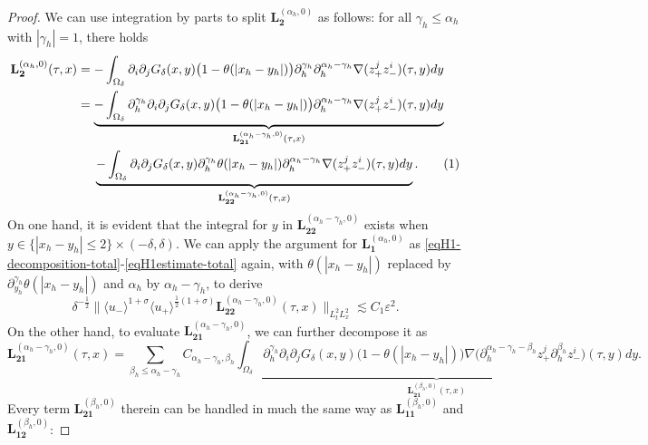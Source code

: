 \documentclass[10pt,reqno]{amsart}
\numberwithin{equation}{section}
\begin{document}
\begin{proof}
	
	We can use integration by parts to split $\mathbf{L}_{\mathbf{2}}^{(\alpha_h,0)}$ as follows:  for all $\gamma_h\leqslant\alpha_h$ with $|\gamma_h|=1$, there holds 
	\begin{align*}
		\mathbf{L}_{\mathbf{2}}^{(\alpha_h,0)}(\tau,x)
		&=-\int_{\Omega_\delta}\partial_i\partial_j G_\delta(x,y)\big(1-\theta(|x_h-y_h|)\big)\partial_{h}^{\gamma_h}\partial_{h}^{\alpha_h-\gamma_h} \nabla(z_+^jz_-^i)(\tau,y)dy\\
		&= \underbrace{-\int_{\Omega_\delta}\partial_{h}^{\gamma_h}\partial_i\partial_j G_\delta(x,y)\big(1-\theta(|x_h-y_h|)\big)\partial_{h}^{\alpha_h-\gamma_h}\nabla(z_+^jz_-^i)(\tau,y)dy}_{\mathbf{L}_{\mathbf{21}}^{(\alpha_h-\gamma_h,0)}(\tau,x)}\\
		&\ \ \ \ \underbrace{-\int_{\Omega_\delta}\partial_i\partial_j G_\delta(x,y)\partial_{h}^{\gamma_h}\theta(|x_h-y_h|)\partial_{h}^{\alpha_h-\gamma_h}\nabla(z_+^jz_-^i)(\tau,y)dy}_{\mathbf{L}_{\mathbf{22}}^{(\alpha_h-\gamma_h,0)}(\tau,x)}.\stepcounter{equation}\tag{\theequation}\label{eqH2-decomposition}
	\end{align*}
	On one hand, it is evident that the integral for $y$ in  $\mathbf{L}_{\mathbf{22}}^{(\alpha_h-\gamma_h,0)}$ exists when $y\in\{|x_h-y_h|\leqslant 2\}\times(-\delta,\delta)$. We can apply the argument for $\mathbf{L}_{\mathbf{1}}^{(\alpha_h,0)}$ as \eqref{eqH1-decomposition-total}-\eqref{eqH1estimate-total} 		 again, 
	with $\theta(|x_h-y_h|)$ replaced by $\partial_{y_h}^{\gamma_h}\theta(|x_h-y_h|)$ and $\alpha_h$ by $\alpha_h-\gamma_h$, to derive 
	\begin{equation}\label{eqH22}
		\delta^{-\frac{1}{2}}\big\|\langle u_-\rangle^{1+\sigma}\langle u_+\rangle^{\frac{1}{2}(1+\sigma)}\mathbf{L}_{\mathbf{22}}^{(\alpha_h-\gamma_h,0)}(\tau,x)\big\|_{L^2_tL^2_x} \lesssim C_1\varepsilon^2.
	\end{equation}
	On the other hand,  to evaluate  $\mathbf{L}_{\mathbf{21}}^{(\alpha_h-\gamma_h,0)}$,	we can  further decompose
	it as 
	\begin{equation*}
		\mathbf{L}_{\mathbf{21}}^{(\alpha_h-\gamma_h,0)}(\tau,x)
		=\sum_{\beta_h\leqslant\alpha_h-\gamma_h}C_{\alpha_h-\gamma_h,\beta_h}\underbrace{\int_{\Omega_\delta}\partial_h^{\gamma_h}\partial_i\partial_jG_\delta(x,y)\big(1-\theta(|x_h-y_h|)\big)\nabla\big(\partial_{h}^{\alpha_h-\gamma_h-\beta_h}z_+^j\partial_{h}^{\beta_h}z_-^i\big)(\tau,y)dy}_{\mathbf{L}_{\mathbf{21}}^{(\beta_h,0)}(\tau,x)}.
	\end{equation*}
	Every term $\mathbf{L}_{\mathbf{21}}^{(\beta_h,0)}$ therein can be handled in much the same way as $\mathbf{L}_{\mathbf{11}}^{(\beta_h,0)}$ and  $\mathbf{L}_{\mathbf{12}}^{(\beta_h,0)}$: 

\end{proof}
\end{document}
